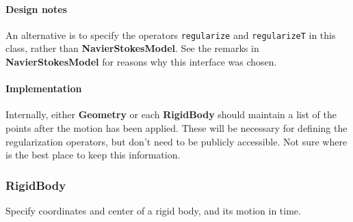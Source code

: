 \documentclass[11pt]{article}
\def\class#1{{\bf #1}} %
\def\fn#1{{\tt #1}} %
\begin{document}
\paragraph{Design notes}
An alternative is to specify the operators \fn{regularize} and \fn{regularizeT} in this class, rather than \class{NavierStokesModel}.  See the remarks in \class{NavierStokesModel} for reasons why this interface was chosen.

\paragraph{Implementation}
Internally, either \class{Geometry} or each \class{RigidBody} should maintain a list of the points after the motion has been applied.  These will be necessary for defining the regularization operators, but don't need to be publicly accessible.  Not sure where is the best place to keep this information.

\subsubsection{RigidBody}
Specify coordinates and center of a rigid body, and its motion in time.
\end{document}
